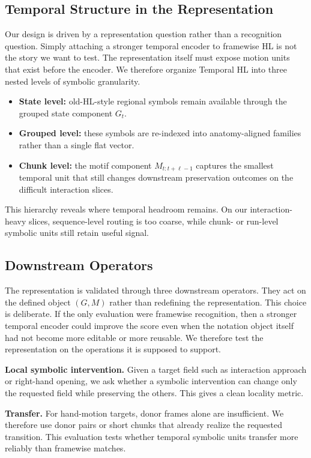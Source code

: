 \documentclass[letterpaper]{article}
\newcommand{\thl}{Temporal HL}
\begin{document}
\subsection{Temporal Structure in the Representation}

Our design is driven by a representation question rather than a recognition
question. Simply attaching a stronger temporal encoder to framewise HL is not
the story we want to test. The representation itself must expose motion units
that exist before the encoder. We therefore organize \thl{} into three nested
levels of symbolic granularity.
\begin{itemize}
    \item \textbf{State level:} old-HL-style regional symbols remain available
    through the grouped state component $G_t$.
    \item \textbf{Grouped level:} these symbols are re-indexed into
    anatomy-aligned families rather than a single flat vector.
    \item \textbf{Chunk level:} the motif component $M_{t:t+\ell-1}$ captures
    the smallest temporal unit that still changes downstream preservation
    outcomes on the difficult interaction slices.
\end{itemize}
This hierarchy reveals where temporal headroom remains. On our
interaction-heavy slices, sequence-level routing is too coarse, while chunk- or
run-level symbolic units still retain useful signal.

\subsection{Downstream Operators}

The representation is validated through three downstream operators. They act on
the defined object $(G, M)$ rather than redefining the representation.
This choice is deliberate. If the only evaluation were framewise recognition,
then a stronger temporal encoder could improve the score even when the notation
object itself had not become more editable or more reusable. We therefore test
the representation on the operations it is supposed to support.

\textbf{Local symbolic intervention.}
Given a target field such as interaction approach or right-hand opening, we ask
whether a symbolic intervention can change only the requested field while
preserving the others. This gives a clean locality metric.

\textbf{Transfer.}
For hand-motion targets, donor frames alone are insufficient. We therefore use
donor pairs or short chunks that already realize the requested transition. This
evaluation tests whether temporal symbolic units transfer more reliably than
framewise matches.
\end{document}
